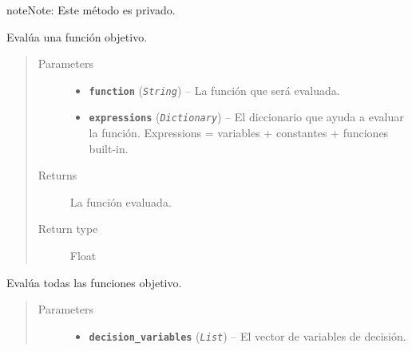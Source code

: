 \documentclass[class=report, crop=false]{standalone}
\begin{document}
\begin{fulllineitems}

\begin{fulllineitems}


\begin{notice}{note}{Note:}
Este método es privado.
\end{notice}

Evalúa una función objetivo.

\begin{quote}\begin{description}
\item[{Parameters}] \leavevmode\begin{itemize}
\item \textbf{\texttt{function}} (\emph{\texttt{String}}) -- La función que será evaluada.
\item \textbf{\texttt{expressions}} (\emph{\texttt{Dictionary}}) -- El diccionario que ayuda a evaluar la función.
Expressions = variables + constantes + funciones built-in.
\end{itemize}
\item[{Returns}] \leavevmode
La función evaluada.
\item[{Return type}] \leavevmode
Float
\end{description}\end{quote}

\end{fulllineitems}

\begin{fulllineitems}

Evalúa todas las funciones objetivo.

\begin{quote}\begin{description}
\item[{Parameters}] \leavevmode\begin{itemize}
\item \textbf{\texttt{decision\_variables}} (\emph{\texttt{List}}) -- El vector de variables de decisión.
\end{itemize}
\end{description}\end{quote}

\end{fulllineitems}


\end{fulllineitems}
\end{document}
